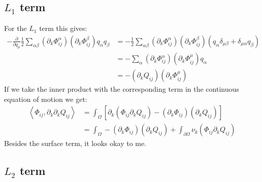 \documentclass[reqno]{article}
\begin{document}
\subsection{$L_1$ term}

For the $L_1$ term this gives:
\begin{equation}
\begin{split}
    -\frac{\partial}{\partial q_\mu} 
    \frac12 \sum_{\alpha \beta} \left(\partial_k \Phi^\alpha_{ij} \right) \left(\partial_k \Phi^\beta_{ij} \right) q_\alpha q_\beta
    &=
    - \frac12 \sum_{\alpha \beta} \left(\partial_k \Phi^\alpha_{ij} \right) \left(\partial_k \Phi^\beta_{ij} \right) 
    \left(
        q_\alpha \delta_{\mu \beta}
        + \delta_{\mu \alpha} q_\beta
    \right) \\
    &=
    - \sum_\alpha \left(\partial_k \Phi^\alpha_{ij} \right) \left(\partial_k \Phi^\mu_{ij} \right) q_\alpha \\
    &=
    -\left( \partial_k Q_{ij} \right) \left( \partial_k \Phi^\mu_{ij} \right)
\end{split}
\end{equation}
If we take the inner product with the corresponding term in the continuous equation of motion we get:
\begin{equation}
\begin{split}
    \left< \Phi_{ij}, \partial_k \partial_k Q_{ij} \right>
    &=
    \int_\Omega \left[
        \partial_k \left( \Phi_{ij} \partial_k Q_{ij} \right)
        - \left( \partial_k \Phi_{ij} \right) \left( \partial_k Q_{ij} \right)
    \right] \\
    &=
    \int_\Omega 
        - \left( \partial_k \Phi_{ij} \right) \left( \partial_k Q_{ij} \right)
    +
    \int_{\partial \Omega}
        \nu_k \left( \Phi_{ij} \partial_k Q_{ij} \right)
\end{split} 
\end{equation}
Besides the surface term, it looks okay to me.

\subsection{$L_2$ term}
\end{document}
